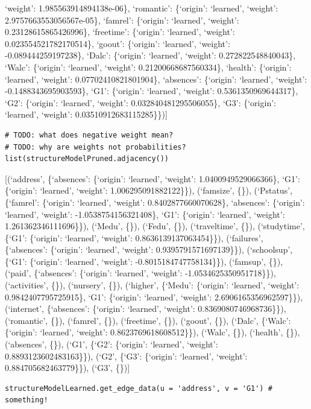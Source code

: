 \documentclass[
]{article}
\begin{document}
`weight': 1.985563914894138e-06\}, `romantic': \{`origin': `learned',
`weight': 2.9757663553056567e-05\}, `famrel': \{`origin': `learned',
`weight': 0.23128615865426996\}, `freetime': \{`origin': `learned',
`weight': 0.023554521782170514\}, `goout': \{`origin': `learned',
`weight': -0.089444259197238\}, `Dalc': \{`origin': `learned', `weight':
0.272822548840043\}, `Walc': \{`origin': `learned', `weight':
0.21200668687560334\}, `health': \{`origin': `learned', `weight':
0.07702410821801904\}, `absences': \{`origin': `learned', `weight':
-0.1488343695903593\}, `G1': \{`origin': `learned', `weight':
0.5361350969644317\}, `G2': \{`origin': `learned', `weight':
0.032840481295506055\}, `G3': \{`origin': `learned', `weight':
0.03510912683115285\}\}){]}

\begin{verbatim}
# TODO: what does negative weight mean?
# TODO: why are weights not probabilities?
list(structureModelPruned.adjacency())
\end{verbatim}

{[}(`address', \{`absences': \{`origin': `learned', `weight':
1.0400949529066366\}, `G1': \{`origin': `learned', `weight':
1.006295091882122\}\}), (`famsize', \{\}), (`Pstatus', \{`famrel':
\{`origin': `learned', `weight': 0.8402877660070628\}, `absences':
\{`origin': `learned', `weight': -1.0538754156321408\}, `G1':
\{`origin': `learned', `weight': 1.261362346111696\}\}), (`Medu', \{\}),
(`Fedu', \{\}), (`traveltime', \{\}), (`studytime', \{`G1': \{`origin':
`learned', `weight': 0.8636139137063454\}\}), (`failures', \{`absences':
\{`origin': `learned', `weight': 0.9395791571697139\}\}), (`schoolsup',
\{`G1': \{`origin': `learned', `weight': -0.8015184747758134\}\}),
(`famsup', \{\}), (`paid', \{`absences': \{`origin': `learned',
`weight': -1.0534625350951718\}\}), (`activities', \{\}), (`nursery',
\{\}), (`higher', \{`Medu': \{`origin': `learned', `weight':
0.9842407795725915\}, `G1': \{`origin': `learned', `weight':
2.6906165356962597\}\}), (`internet', \{`absences': \{`origin':
`learned', `weight': 0.8369080746968736\}\}), (`romantic', \{\}),
(`famrel', \{\}), (`freetime', \{\}), (`goout', \{\}), (`Dalc',
\{`Walc': \{`origin': `learned', `weight': 0.8623769618608512\}\}),
(`Walc', \{\}), (`health', \{\}), (`absences', \{\}), (`G1', \{`G2':
\{`origin': `learned', `weight': 0.8893123602483163\}\}), (`G2', \{`G3':
\{`origin': `learned', `weight': 0.884705682463779\}\}), (`G3', \{\}){]}

\begin{verbatim}
structureModelLearned.get_edge_data(u = 'address', v = 'G1') # something!
\end{verbatim}
\end{document}
